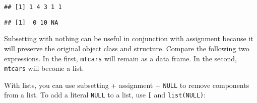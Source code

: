 \begin{verbatim}
## [1] 1 4 3 1 1
\end{verbatim}

\begin{Shaded}
\begin{Highlighting}[]
\StringTok{ }\NormalTok{(} \NormalTok{(}\NormalTok{, }\NormalTok{, }\NormalTok{))}
\OperatorTok{$}\NormalTok{a[df}\OperatorTok{$}\OperatorTok{<}\StringTok{ }\NormalTok{] <-}\StringTok{ }
\OperatorTok{$}
\end{Highlighting}
\end{Shaded}

\begin{verbatim}
## [1]  0 10 NA
\end{verbatim}

Subsetting with nothing can be useful in conjunction with assignment
because it will preserve the original object class and structure.
Compare the following two expressions. In the first, \texttt{mtcars}
will remain as a data frame. In the second, \texttt{mtcars} will become
a list.

\begin{Shaded}
\begin{Highlighting}[]
\StringTok{ }
\StringTok{ }
\end{Highlighting}
\end{Shaded}

With lists, you can use subsetting + assignment + \texttt{NULL} to
remove components from a list. To add a literal \texttt{NULL} to a list,
use \texttt{{[}} and \texttt{list(NULL)}:

\begin{Shaded}
\begin{Highlighting}[]
\StringTok{ }\NormalTok{(} \NormalTok{, } \NormalTok{)}
\NormalTok{x[[}\NormalTok{]] <-}\StringTok{ }
\end{Highlighting}
\end{Shaded}

